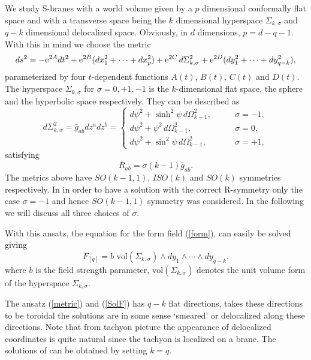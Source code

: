 \documentclass[a4paper,aps,nofootinbib,showpacs,preprint]{revtex4}
\begin{document}
We study S-branes with a world volume given by a $p$ dimensional
conformally flat space and with a transverse space being the $k$
dimensional hyperspace $\Sigma_{k,\sigma}$ and $q-k$ dimensional
delocalized space. Obviously, in $d$ dimensions, $p=d-q-1$. With
this in mind we choose the metric
\begin{equation}\label{metric}
ds^2 = - {\rm e}^{2A} dt^2 + {\rm e}^{2B} (dx_1^2 + \cdots +
dx_p^2) + {\rm e}^{2C} \, d\Sigma_{k,\sigma}^2 + {\rm e}^{2D}
(dy_1^2 + \cdots + dy_{q-k}^2),
\end{equation}
parameterized by four $t$-dependent functions $A(t),\,B(t),\,
C(t)$ and $D(t)$. The hyperspace $\Sigma_{k,\sigma}$ for
$\sigma=0,+1,-1$ is the $k$-dimensional flat space, the sphere
and the hyperbolic space respectively. They can be described as
\begin{equation}
d\Sigma_{k,\sigma}^2 = \bar g_{ab} dz^a dz^b = \left\{
 \begin{array}{ll}
 d \psi^2 + \sinh^2\psi \, d\Omega_{k-1}^2, \qquad & \sigma=-1,\\
 d \psi^2 + \psi^2 \, d\Omega_{k-1}^2, \qquad & \sigma=0,\\
 d \psi^2 + \sin^2\psi \, d\Omega_{k-1}^2, \qquad & \sigma=+1,
 \end{array} \right.
\label{gmetric}\end{equation}
satisfying
\begin{equation}
\bar R_{ab} = \sigma (k - 1) \bar g_{ab}.
\end{equation}
The metrics above have $SO(k-1,1),\, ISO(k)$ and $SO(k)$
symmetries respectively. In \cite{GS02} in order to have a
solution with the correct R-symmetry only the case $\sigma=-1$ and
hence $SO(k-1,1)$ symmetry was considered. In the following we
will discuss all three choices of $\sigma$.

With this ansatz, the equation for the form field (\ref{form}),
can easily be solved giving
\begin{equation}\label{SolF}
F_{[q]} = b  \,\, \mbox{vol}(\Sigma_{k,\sigma}) \wedge dy_1 \wedge
\cdots \wedge dy_{q-k}.
\end{equation}
where $b$ is the field strength parameter,
$\mbox{vol}(\Sigma_{k,\sigma})$ denotes the unit volume form of
the hyperspace $\Sigma_{k,\sigma}$.

The ansatz (\ref{metric}) and (\ref{SolF}) has $q-k$ flat
directions, takes these directions to be toroidal the solutions
are in some sense `smeared' or delocalized along these directions.
Note that from tachyon picture the appearance of delocalized
coordinates is quite natural since the tachyon is localized on a
brane. The solutions of \cite{GS02} can be obtained by setting
$k=q$.
\end{document}
